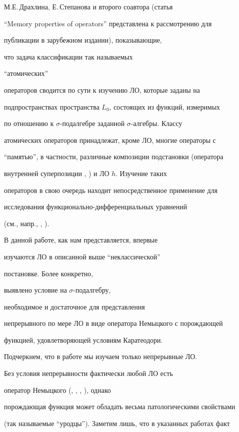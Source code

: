 М.Е.\,Драх\-лина, Е.\,Степанова и второго соавтора (статья


``Memory properties of operators'' представлена к рассмотрению для


публикации в зарубежном издании), показывающие,


что задача классификации так называемых


``ато\-ми\-чес\-ких''


операторов сводится по сути к изучению ЛО, которые заданы на


подпространствах пространства $L_0$, состоящих из функций, измеримых


по отношению к $\sigma$-подал\-геб\-ре заданной $\sigma$-ал\-геб\-ры. Классу


атомических операторов принадлежат, кроме ЛО, многие операторы с


``па\-мя\-тью'', в частности, различные композиции подстановки (опе\-ра\-то\-ра


внутренней суперпозиции \cite{20}, \cite{33}) и ЛО $h$. Изучение таких


операторов в свою очередь находит непосредственное применение для


исследования функ\-ци\-о\-наль\-но-диф\-фе\-рен\-ци\-аль\-ных уравнений


(см., напр., \cite{33}, \cite{34}).





В данной работе, как нам представляется, впервые


изучаются ЛО в описанной выше ``не\-клас\-си\-чес\-кой''


постановке. Более конкретно,


выявлено условие на $\sigma$-под\-ал\-геб\-ру,


необходимое и достаточное для представления


непрерывного по мере ЛО в виде оператора Немыцкого с порождающей


функцией, удовлетворяющей условиям Каратеодори.


Подчеркнем, что в работе мы изучаем только непрерывные ЛО.


Без условия непрерывности фактически любой ЛО есть


оператор Немыцкого (\cite{22}, \cite{7}, \cite{8}, \cite{23}), однако


порождающая функция может обладать весьма патологическими свойствами


(так называемые ``уродцы''). Заметим лишь, что в указанных работах факт


